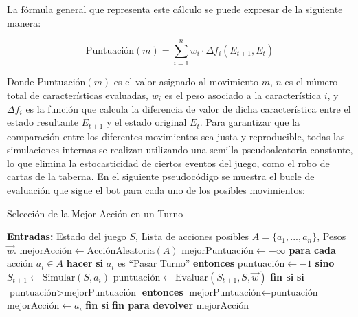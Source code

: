 La fórmula general que representa este cálculo se puede expresar de la siguiente manera:

$$ \text{Puntuación}(m) = \sum_{i=1}^{n} w_i \cdot \Delta f_i(E_{t+1}, E_t) $$ \label{eq:puntuacion_movimiento}

Donde $\text{Puntuación}(m)$ es el valor asignado al movimiento $m$, $n$ es el número total de características evaluadas, $w_i$ es el peso asociado a la característica $i$, y $\Delta f_i$ es la función que calcula la diferencia de valor de dicha característica entre el estado resultante $E_{t+1}$ y el estado original $E_t$. Para garantizar que la comparación entre los diferentes movimientos sea justa y reproducible, todas las simulaciones internas se realizan utilizando una semilla pseudoaleatoria constante, lo que elimina la estocasticidad de ciertos eventos del juego, como el robo de cartas de la taberna. En el siguiente pseudocódigo se muestra el bucle de evaluación que sigue el bot para cada uno de los posibles movimientos:

\begin{algorithm}[H]
    \caption{Selección de la Mejor Acción en un Turno}
    \label{alg:get_best_move}
    \begin{algorithmic}[1]
        \State {}
        \State \textbf{Entradas:} Estado del juego $S$, Lista de acciones posibles $A = \{a_1, ..., a_n\}$, Pesos $\vec{w}$.
        \State
        \State $\text{mejorAcción} \leftarrow \text{AcciónAleatoria}(A)$
        \State $\text{mejorPuntuación} \leftarrow -\infty$
        \State
        \State \textbf{para cada} acción $a_i \in A$ \textbf{hacer}
        \State \quad \textbf{si} $a_i$ es ``Pasar Turno'' \textbf{entonces}
        \State \qquad $\text{puntuación} \leftarrow -1$
        \State \quad \textbf{sino}
        \State \qquad $S_{t+1} \leftarrow \text{Simular}(S, a_i)$
        \State \qquad $\text{puntuación} \leftarrow \text{Evaluar}(S_{t+1}, S, \vec{w})$ 
        \State \quad \textbf{fin si}
        \State
        \State \quad \textbf{si} $\text{puntuación} > \text{mejorPuntuación}$ \textbf{entonces}
        \State \qquad $\text{mejorPuntuación} \leftarrow \text{puntuación}$
        \State \qquad $\text{mejorAcción} \leftarrow a_i$
        \State \quad \textbf{fin si}
        \State \textbf{fin para}
        \State
        \State \textbf{devolver} $\text{mejorAcción}$
    \end{algorithmic}
\end{algorithm}

